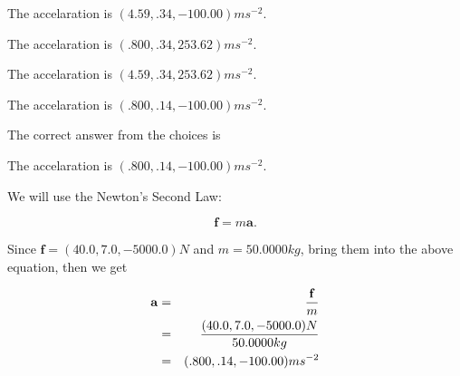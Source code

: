 \documentclass[12pt]{article}
\begin{document}
 
The accelaration is $  %
(
4.59,
.34,
-100.00)
ms^{-2} $.
 
 
The accelaration is $  %
(
.800,
.34,
253.62)
ms^{-2} $.
 
 
The accelaration is $  %
(
4.59,
.34,
253.62)
ms^{-2} $.
 
 
\noindent{}
 
 
The accelaration is $  %
(
.800,
.14,
-100.00)
ms^{-2} $.
 
 
\noindent{}
 
 
 
 
 
\noindent{}
 
 

The correct answer from the choices is


The accelaration is $  %
(
.800,
.14,
-100.00)
ms^{-2} $.
 
 
 
\noindent{}
 
 

 
 
 
\noindent{}
 
 

We will use the Newton's Second Law:
 
\[
\mathbf{f}=m\mathbf{a}.
\]
 
Since $\mathbf{f}= %
(40.0 , 7.0 , -5000.0) N$
and $m= %
50.0000kg$, bring them into the above equation, then we get
 
\begin{eqnarray*}
\mathbf{a}&=&\frac{\mathbf{f}}m  \\
&=&\frac{ %
(40.0 , 7.0 , -5000.0) N}{ %
50.0000kg}  \\
&=& %
(.800 , .14 , -100.00) ms^{-2}
\end{eqnarray*}
 
 
 
\noindent{}
 
\end{document}
